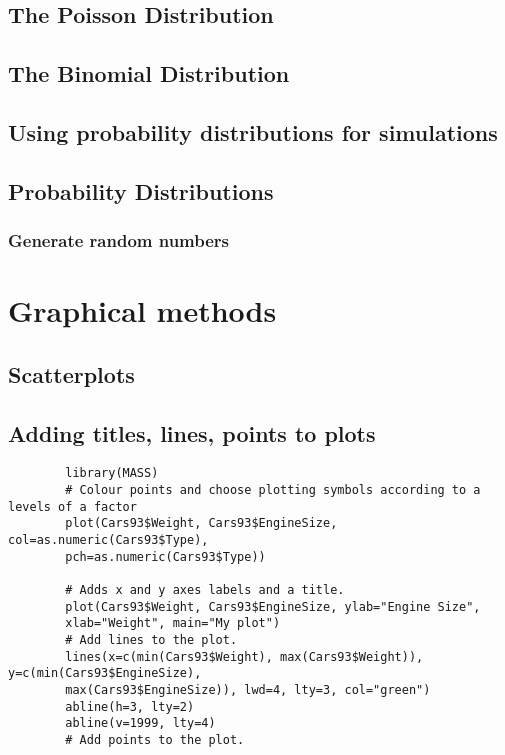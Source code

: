 \documentclass[a4paper,12pt]{article}
\begin{document}
\begin{itemize}
\begin{itemize}
		\section{The Poisson Distribution}
		\section{The Binomial Distribution}
		\section{Using probability distributions for simulations}
		\section{Probability Distributions}
		\subsection{Generate random numbers }
		
		\newpage
		\chapter{Graphical methods}
		
		\section{Scatterplots}
		
		
		\section{Adding titles, lines, points to plots}
		
		
		\large \begin{verbatim}
		library(MASS)
		# Colour points and choose plotting symbols according to a levels of a factor
		plot(Cars93$Weight, Cars93$EngineSize, col=as.numeric(Cars93$Type),
		pch=as.numeric(Cars93$Type))
		
		# Adds x and y axes labels and a title.
		plot(Cars93$Weight, Cars93$EngineSize, ylab="Engine Size",
		xlab="Weight", main="My plot")
		# Add lines to the plot.
		lines(x=c(min(Cars93$Weight), max(Cars93$Weight)), y=c(min(Cars93$EngineSize),
		max(Cars93$EngineSize)), lwd=4, lty=3, col="green")
		abline(h=3, lty=2)
		abline(v=1999, lty=4)
		# Add points to the plot.
		\end{verbatim}\large
		

\end{itemize}
\end{itemize}
\end{document}
